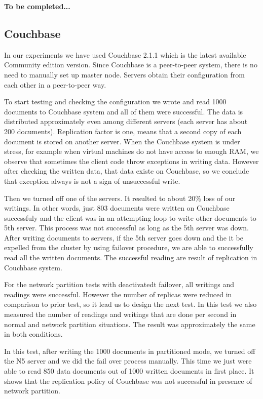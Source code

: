 \documentclass[a4paper]{article}
\begin{document}
{\bf To be completed...}

\subsection{Couchbase}

In our experiments we have used Couchbase 2.1.1 which is the latest available Community edition version. 
Since Couchbase is a peer-to-peer system, there is no need to manually set up master node. 
Servers obtain their configuration from each other in a peer-to-peer way.

To start testing and checking the configuration we wrote and read 1000 documents to Couchbase system and all of them were successful. 
The data is distributed approximately even among different servers (each server has about 200 documents).
Replication factor is one, means that a second copy of each document is stored on another server.
When the Couchbase system is under stress, for example when virtual machines do not have access to enough RAM, we observe that sometimes the client code throw exceptions in writing data.
However after checking the written data, that data existe on Couchbase, so we conclude that exception always is not a sign of unsuccessful write.  

Then we turned off one of the servers. 
It resulted to about 20\% loss of our writings.
In other words, just 803 documents were written on Couchbase successfuly and the client was in an attempting loop to write other documents to 5th server.
This process was not successful as long as the 5th server was down.
After writing documents to servers, if the 5th server goes down and the it be expelled from the cluster by using failover procedure, we are able to successfully read all the written documents. The successful reading are result of replication in Couchbase system.

For the network partition tests with deactivatedt failover, all writings and readings were successful.  
However the number of replicas were reduced in comparison to prior test, so it lead us to design the next test. 
In this test we also measured the number of readings and writings that are done per second in normal and network partition situations.
The result was approximately the same in both conditions.

In this test, after writing the 1000 documents in partitioned mode, we turned off the N5 server and we did the fail over process manually.
This time we just were able to read 850 data documents out of 1000 written documents in first place. 
It shows that the replication policy of Couchbase was not successful in presence of network partition.
\end{document}

